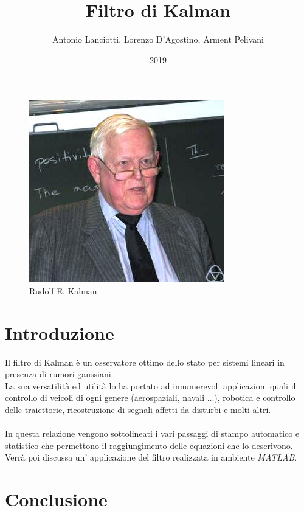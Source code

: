 \documentclass{article}
\title{Filtro di Kalman}
\author{Antonio Lanciotti, Lorenzo D'Agostino, Arment Pelivani}
\date{2019}
\numberwithin{equation}{section}
\begin{document}
\maketitle

\begin{figure}[ht]
\centering
\includegraphics[scale=1]{Rudolf_Kalman.jpg} 
\caption{Rudolf E. Kalman}
\label{fig:kalman}
\end{figure}

\newpage

\tableofcontents

\newpage



\section{Introduzione}
Il filtro di Kalman è un osservatore ottimo dello stato per sistemi lineari in presenza di rumori gaussiani.\\
La sua versatilità ed utilità lo ha portato ad innumerevoli applicazioni quali il controllo di veicoli di ogni genere (aerospaziali, navali ...), robotica e controllo delle traiettorie, ricostruzione di segnali affetti da disturbi e molti altri.\\\\
In questa relazione vengono sottolineati i vari passaggi di stampo automatico e statistico che permettono il raggiungimento delle equazioni che lo descrivono.\\
Verrà poi discussa un' applicazione del filtro realizzata in ambiente \textit{MATLAB}.

\newpage













\section{Conclusione}

\newpage


\end{document}
